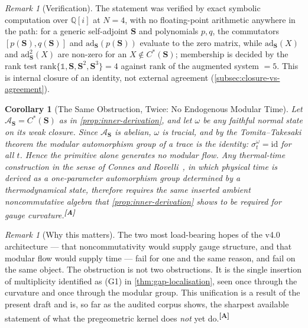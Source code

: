 \documentclass[12pt,a4paper,twoside]{article}
\theoremstyle{plain}
\newtheorem{corollary}[theorem]{Corollary}
\theoremstyle{definition}
\theoremstyle{remark}
\newtheorem{remark}[theorem]{Remark}
\newcommand{\catmark}[1]{\textsuperscript{\textsf{\textbf{[#1]}}}}
\begin{document}
\begin{remark}[Verification]
\label{rem:inner-derivation-check}
The statement was verified by exact symbolic computation over
$\mathbb Q[i]$ at $N=4$, with no floating-point arithmetic anywhere in
the path: for a generic self-adjoint $\mathbf S$ and polynomials $p, q$,
the commutators $[p(\mathbf S), q(\mathbf S)]$ and
$\mathrm{ad}_{\mathbf S}(p(\mathbf S))$ evaluate to the zero matrix,
while $\mathrm{ad}_{\mathbf S}(X)$ and $\mathrm{ad}_{\mathbf S}^{2}(X)$
are non-zero for an $X \notin C^{\ast}(\mathbf S)$; membership is decided
by the rank test $\mathrm{rank}\{\mathbb 1, \mathbf S, \mathbf S^2,
\mathbf S^3\} = 4$ against $\mathrm{rank}$ of the augmented system $= 5$.
This is internal closure of an identity, not external agreement
(\cref{subsec:closure-vs-agreement}).
\end{remark}

\begin{corollary}[The Same Obstruction, Twice: No Endogenous Modular Time]
\label{cor:modular-relocation}
Let $\mathcal A_{\mathbf S} = C^{\ast}(\mathbf S)$ as in
\cref{prop:inner-derivation}, and let $\omega$ be any faithful normal
state on its weak closure. Since $\mathcal A_{\mathbf S}$ is abelian,
$\omega$ is tracial, and by the Tomita--Takesaki theorem the modular
automorphism group of a trace is the identity: $\sigma^{\omega}_t =
\mathrm{id}$ for all $t$. Hence the primitive alone generates no modular
flow. Any thermal-time construction in the sense of Connes and
Rovelli~\cite{connesrovelli1994}, in which physical time is derived as a
one-parameter automorphism group determined by a thermodynamical state,
therefore requires the same inserted ambient noncommutative algebra that
\cref{prop:inner-derivation} shows to be required for gauge
curvature.\catmark{A}
\end{corollary}

\begin{remark}[Why this matters]
\label{rem:one-obstruction}
The two most load-bearing hopes of the v4.0 architecture --- that
noncommutativity would supply gauge structure, and that modular flow
would supply time --- fail for one and the same reason, and fail on the
same object. The obstruction is not two obstructions. It is the single
insertion of multiplicity identified as (G1) in
\cref{thm:gap-localisation}, seen once through the curvature and once
through the modular group. This unification is a result of the present
draft and is, so far as the audited corpus shows, the sharpest available
statement of what the pregeometric kernel does \emph{not} yet
do.\catmark{A}
\end{remark}
\end{document}
